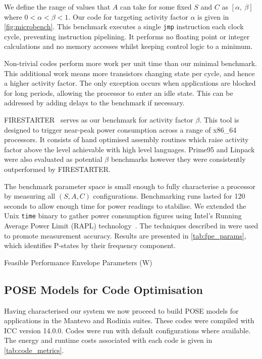 We define the range of values that $A$ can take for some fixed $S$ and $C$ as $[\alpha,~\beta]$ where $0 < \alpha < \beta < 1$.
Our code for targeting activity factor $\alpha$ is given in \autoref{fig:microbench}.
This benchmark executes a single \texttt{jmp} instruction each clock cycle, preventing instruction pipelining.
It performs no floating point or integer calculations and no memory accesses whilst keeping control logic to a minimum.

Non-trivial codes perform more work per unit time than our minimal benchmark.
This additional work means more transistors changing state per cycle, and hence a higher activity factor.
The only exception occurs when applications are blocked for long periods, allowing the processor to enter an idle state.
This can be addressed by adding delays to the benchmark if necessary.

FIRESTARTER~\cite{hackenberg:2013ab} serves as our benchmark for activity factor $\beta$.
This tool is designed to trigger near-peak power consumption across a range of x86\_64 processors.
It consists of hand optimised assembly routines which raise activity factor above the level achievable with high level languages.
Prime95 and Linpack were also evaluated as potential $\beta$ benchmarks however they were consistently outperformed by FIRESTARTER.

The benchmark parameter space is small enough to fully characterise a processor by measuring all $(S,A,C)$ configurations.
Benchmarking runs lasted for 120 seconds to allow enough time for power readings to stabilise.
We extended the Unix \texttt{time} binary to gather power consumption figures using Intel's Running Average Power Limit (RAPL) technology~\cite{david:2010aa}.
The techniques described in \cite{hahnel:2012aa} were used to promote measurement accuracy.
Results are presented in \autoref{tab:fpe_params}, which identifies P-states by their frequency component.

\begin{table}
\centering
\caption{Feasible Performance Envelope Parameters (W)}
\label{tab:fpe_params}

\end{table}

\subsection{POSE Models for Code Optimisation}
Having characterised our system we now proceed to build POSE models for applications in the Mantevo and Rodinia suites.
These codes were compiled with ICC version 14.0.0.
Codes were run with default configurations where available.
The energy and runtime costs associated with each code is given in \autoref{tab:code_metrics}.

